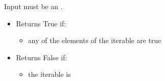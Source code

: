 Input must be an .
\begin{itemize}
  \item Returns True if:
    \begin{itemize}
      \item any of the elements of the iterable are true
    \end{itemize}
  \item Returns False if:
    \begin{itemize}
      \item the iterable is {}
    \end{itemize}
\end{itemize}
